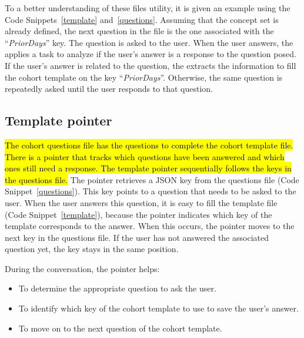 To a better understanding of these files utility, it is given an example using the Code Snippets~\ref{template} and~\ref{questions}. Assuming that the concept set is already defined, the next question in the file is the one associated with the ``\textit{PriorDays}'' key. The question is asked to the user. When the user answers, the {\llm} applies a {\nlu} task to analyze if the user's answer is a response to the question posed. If the user's answer is related to the question, the {\llm} extracts the information to fill the cohort template on the key ``\textit{PriorDays}''. Otherwise, the same question is repeatedly asked until the user responds to that question. 


\subsection{Template pointer}




\hl{The cohort questions file has the questions to complete the cohort template file. There is a pointer that tracks which questions have been answered and which ones still need a response. The template pointer sequentially follows the keys in the questions file.} The pointer retrieves a JSON key from the questions file (Code Snippet~\ref{questions}). This key points to a question that needs to be asked to the user. When the user answers this question, it is easy to fill the template file (Code Snippet~\ref{template}), because the pointer indicates which key of the template corresponds to the answer. When this occurs, the pointer moves to the next key in the questions file. If the user has not answered the associated question yet, the key stays in the same position.

During the conversation, the pointer helps:

\begin{itemize}
  \item To determine the appropriate question to ask the user.
  \item To identify which key of the cohort template to use to save the user's answer.
  \item To move on to the next question of the cohort template.
\end{itemize}

